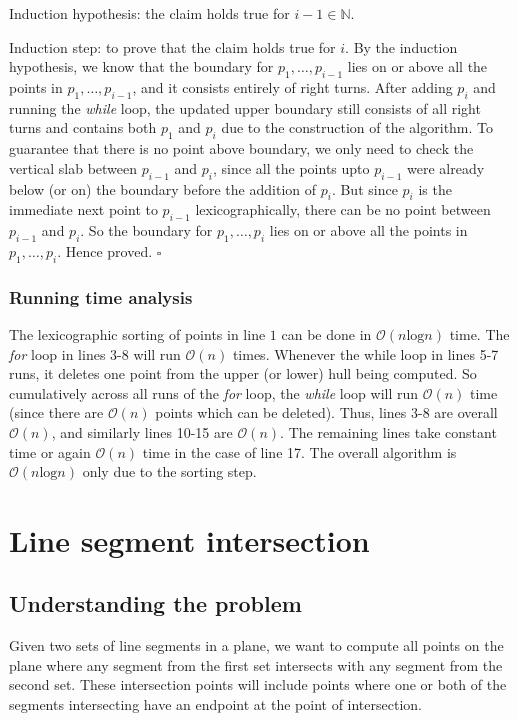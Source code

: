 \documentclass{article}
\begin{document}
Induction hypothesis: the claim holds true for $i-1 \in \mathbb{N}$. 

Induction step: to prove that the claim holds true for $i$. By the induction hypothesis, we know that the boundary for $p_1, \ldots, p_{i-1}$ lies on or above all the points in $p_1, \ldots, p_{i-1}$, and it consists entirely of right turns. After adding $p_i$ and running the \textit{while} loop, the updated upper boundary still consists of all right turns and contains both $p_1$ and $p_i$ due to the construction of the algorithm. To guarantee that there is no point above boundary, we only need to check the vertical slab between $p_{i-1}$ and $p_i$, since all the points upto $p_{i-1}$ were already below (or on) the boundary before the addition of $p_i$. But since $p_i$ is the immediate next point to $p_{i-1}$ lexicographically, there can be no point between $p_{i-1}$ and $p_i$. So the boundary for $p_1, \ldots, p_i$ lies on or above all the points in $p_1, \ldots, p_i$. Hence proved. \hfill $\square$

\subsubsection{Running time analysis}

The lexicographic sorting of points in line $1$ can be done in $\mathcal{O}(n\text{log}n)$ time. The \emph{for} loop in lines 3-8 will run $\mathcal{O}(n)$ times. Whenever the while loop in lines 5-7 runs, it deletes one point from the upper (or lower) hull being computed. So cumulatively across all runs of the \emph{for} loop, the \emph{while} loop will run $\mathcal{O}(n)$ time (since there are $\mathcal{O}(n)$ points which can be deleted). Thus, lines 3-8 are overall $\mathcal{O}(n)$, and similarly lines 10-15 are $\mathcal{O}(n)$. The remaining lines take constant time or again $\mathcal{O}(n)$ time in the case of line 17. The overall algorithm is $\mathcal{O}(n\text{log}n)$ only due to the sorting step.

\pagebreak

\section{Line segment intersection}

\subsection{Understanding the problem}

Given two sets of line segments in a plane, we want to compute all points on the plane where any segment from the first set intersects with any segment from the second set. These intersection points will include points where one or both of the segments intersecting have an endpoint at the point of intersection.
\end{document}
